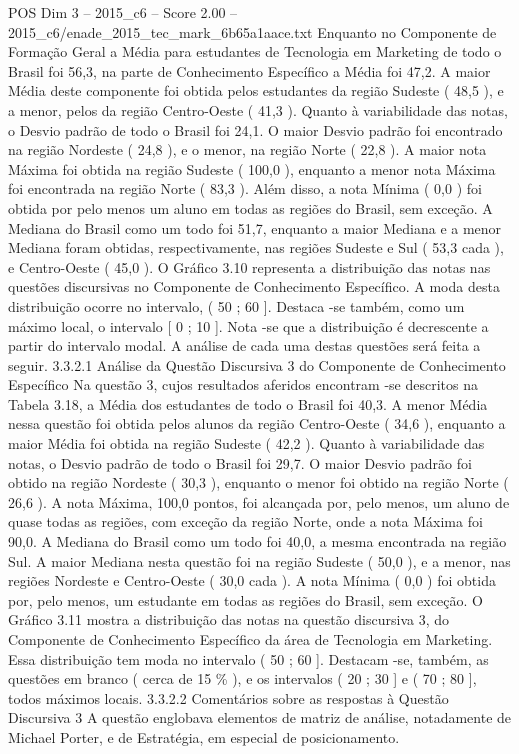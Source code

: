 \begin{textsample}{POS Dim 3 – 2015\_c6 – Score 2.00 – 2015\_c6/enade\_2015\_tec\_mark\_6b65a1aace.txt}
Enquanto no Componente de Formação Geral a Média para estudantes de Tecnologia em Marketing de todo o Brasil foi 56,3, na parte de Conhecimento Específico a Média foi 47,2.
A maior Média deste componente foi obtida pelos estudantes da região Sudeste ( 48,5 ), e a menor, pelos da região Centro-Oeste ( 41,3 ).
Quanto à variabilidade das notas, o Desvio padrão de todo o Brasil foi 24,1.
O maior Desvio padrão foi encontrado na região Nordeste ( 24,8 ), e o menor, na região Norte ( 22,8 ).
A maior nota Máxima foi obtida na região Sudeste ( 100,0 ), enquanto a menor nota Máxima foi encontrada na região Norte ( 83,3 ).
Além disso, a nota Mínima ( 0,0 ) foi obtida por pelo menos um aluno em todas as regiões do Brasil, sem exceção.
A Mediana do Brasil como um todo foi 51,7, enquanto a maior Mediana e a menor Mediana foram obtidas, respectivamente, nas regiões Sudeste e Sul ( 53,3 cada ), e Centro-Oeste ( 45,0 ).
O Gráfico 3.10 representa a distribuição das notas nas questões discursivas no Componente de Conhecimento Específico.
A moda desta distribuição ocorre no intervalo, ( 50 ; 60 ].
Destaca -se também, como um máximo local, o intervalo [ 0 ; 10 ].
Nota -se que a distribuição é decrescente a partir do intervalo modal.
A análise de cada uma destas questões será feita a seguir. 3.3.2.1 Análise da Questão Discursiva 3 do Componente de Conhecimento Específico Na questão 3, cujos resultados aferidos encontram -se descritos na Tabela 3.18, a Média dos estudantes de todo o Brasil foi 40,3.
A menor Média nessa questão foi obtida pelos alunos da região Centro-Oeste ( 34,6 ), enquanto a maior Média foi obtida na região Sudeste ( 42,2 ).
Quanto à variabilidade das notas, o Desvio padrão de todo o Brasil foi 29,7.
O maior Desvio padrão foi obtido na região Nordeste ( 30,3 ), enquanto o menor foi obtido na região Norte ( 26,6 ).
A nota Máxima, 100,0 pontos, foi alcançada por, pelo menos, um aluno de quase todas as regiões, com exceção da região Norte, onde a nota Máxima foi 90,0.
A Mediana do Brasil como um todo foi 40,0, a mesma encontrada na região Sul.
A maior Mediana nesta questão foi na região Sudeste ( 50,0 ), e a menor, nas regiões Nordeste e Centro-Oeste ( 30,0 cada ).
A nota Mínima ( 0,0 ) foi obtida por, pelo menos, um estudante em todas as regiões do Brasil, sem exceção.
O Gráfico 3.11 mostra a distribuição das notas na questão discursiva 3, do Componente de Conhecimento Específico da área de Tecnologia em Marketing.
Essa distribuição tem moda no intervalo ( 50 ; 60 ].
Destacam -se, também, as questões em branco ( cerca de 15 \% ), e os intervalos ( 20 ; 30 ] e ( 70 ; 80 ], todos máximos locais. 3.3.2.2 Comentários sobre as respostas à Questão Discursiva 3 A questão englobava elementos de matriz de análise, notadamente de Michael Porter, e de Estratégia, em especial de posicionamento.

\end{textsample}
